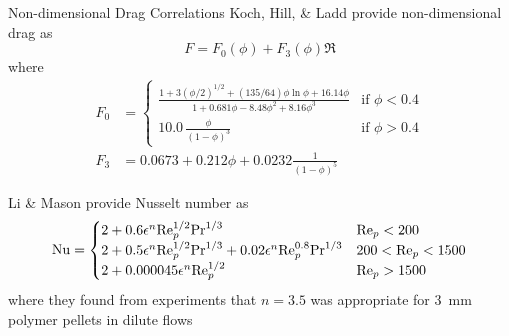 \begin{frame}{Non-dimensional Drag Correlations}
Koch, Hill, \& Ladd provide non-dimensional drag as
\begin{equation}\label{eq:khl-correlation}
	F = F_0(\phi) + F_3(\phi)\Re
\end{equation}
where 
\begin{subequations}
\begin{align}
F_0 &= \begin{cases}
	\frac{1+3(\phi/2)^{1/2} + (135/64)\phi\ln\phi + 16.14\phi}{1 + 0.681\phi - 8.48 \phi^2 + 8.16\phi^3} & \text{if $\phi < 0.4$}\\
	10.0\,\frac{\phi}{(1-\phi)^3} & \text{if $\phi > 0.4$} 
	\end{cases}\\
F_3 &= 0.0673 + 0.212\phi + 0.0232 \frac{1}{(1-\phi)^5}
\end{align}
\end{subequations}

Li \& Mason provide Nusselt number as
\begin{equation}\label{eq:li-mason-correlation}
	\mathrm{Nu} = \begin{cases}
	2+ 0.6\epsilon^n\mathrm{Re}_p^{1/2}\mathrm{Pr}^{1/3} 										& \mathrm{Re}_p < 200\\
	2+ 0.5\epsilon^n\mathrm{Re}_p^{1/2}\mathrm{Pr}^{1/3} + 0.02 \epsilon^n \mathrm{Re}_p^{0.8}\mathrm{Pr}^{1/3} & 200 < \mathrm{Re}_p < 1500\\
	2+ 0.000045\epsilon^n\mathrm{Re}_p^{1/2}			 								& \mathrm{Re}_p > 1500
	\end{cases}
\end{equation}
where they found from experiments that $n=3.5$ was appropriate for 3~mm polymer pellets in dilute flows
\end{frame}


